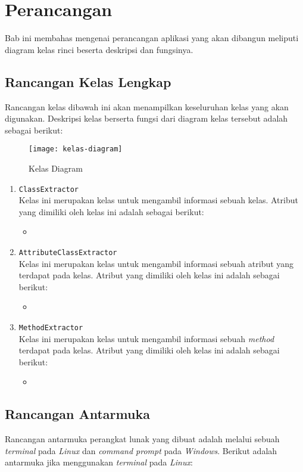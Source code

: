 \chapter{Perancangan}
\label{sec:perancangan}

Bab ini membahas mengenai perancangan aplikasi yang akan dibangun meliputi diagram kelas rinci beserta deskripsi dan fungsinya.

\section{Rancangan Kelas Lengkap}
\label{sec:kelaslengkap}
Rancangan kelas dibawah ini akan menampilkan keseluruhan kelas yang akan digunakan. Deskripsi kelas berserta fungsi dari diagram kelas tersebut adalah sebagai berikut:

\begin{figure}[H]
	\centering  
	\texttt{[image: kelas-diagram]}  
	\caption[Kelas Diagram]{Kelas Diagram} 
	\label{fig:kelas-diagram} 
\end{figure} 

\begin{enumerate}
	\item {\texttt{ClassExtractor}}\\
	Kelas ini merupakan kelas untuk mengambil informasi sebuah kelas. Atribut yang dimiliki oleh kelas ini adalah sebagai berikut:
	\begin{itemize}
		\item 
	\end{itemize}
	 
	\item {\texttt{AttributeClassExtractor}}\\
	Kelas ini merupakan kelas untuk mengambil informasi sebuah atribut yang terdapat pada kelas. Atribut yang dimiliki oleh kelas ini adalah sebagai berikut:
	\begin{itemize}
		\item 
	\end{itemize}

	
	\item {\texttt{MethodExtractor}}\\
	Kelas ini merupakan kelas untuk mengambil informasi sebuah {\it method} terdapat pada kelas. Atribut yang dimiliki oleh kelas ini adalah sebagai berikut:
	\begin{itemize}
		\item 
	\end{itemize}
	
\end{enumerate}

\section{Rancangan Antarmuka}
\label{sec:antarmuka}
Rancangan antarmuka perangkat lunak yang dibuat adalah melalui sebuah {\it terminal} pada {\it Linux} dan {\it command prompt} pada {\it Windows}. Berikut adalah antarmuka jika menggunakan {\it terminal} pada {\it Linux}: 



